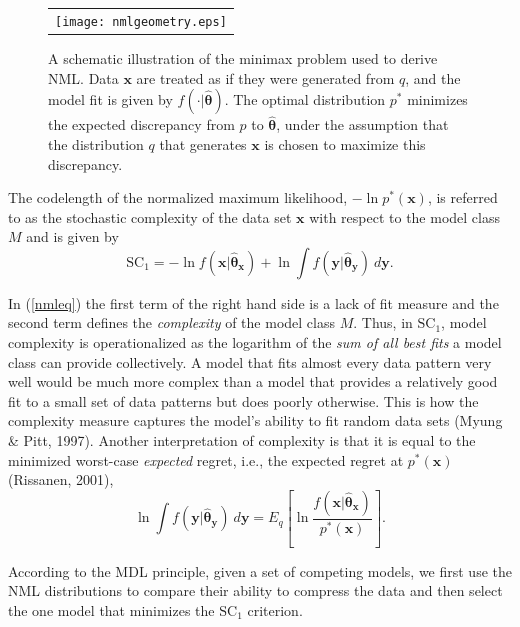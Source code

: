 \documentclass{elsart}
\newcommand{\efc}{\vspace*{15pt}}
\begin{document}
\begin{figure}[t]
   \begin{center}
   \begin{tabular}{c}
  \texttt{[image: nmlgeometry.eps]}
   \end{tabular}
   \end{center}
   \caption{A schematic illustration of the minimax problem used to derive NML. Data $\bm x$
are treated as if they were generated from $q$, and the model fit is given by
$f(\cdot|\hat{\bm\theta})$. The optimal distribution $p^*$ minimizes the expected discrepancy from
$p$ to $\hat{\bm\theta}$, under the assumption that the distribution $q$ that generates $\bm x$ is
chosen to maximize this discrepancy.}
 \label{nmlgeometry}
\efc
\end{figure}

The codelength of the normalized maximum likelihood, $-\ln p^*(\bm x)$, is referred to as the
stochastic complexity of the data set $\bm x$ with respect to the model class $M$ and is given by
\begin{equation} \label{nmleq}
\mbox{SC}_1  =  -\ln f(\bm{x}|\hat{\bm{\theta}}_{\bm{x}}) + \ln \int
f(\bm{y}|\hat{\bm{\theta}}_{\bm{y}}) \ d\bm{y} \nonumber.
\end{equation}

In (\ref{nmleq}) the first term of the right hand side is a lack of fit measure and the second
term defines the {\it complexity} of the model class $M$. Thus, in $\mbox{SC}_1$, model complexity
is operationalized as the logarithm of the {\it sum of all best fits} a model class can provide
collectively. A model that fits almost every data pattern very well would be much more complex
than a model that provides a relatively good fit to a small set of data patterns but does poorly
otherwise. This is how the complexity measure captures the model's ability to fit random data sets
(Myung \& Pitt, 1997). Another interpretation of complexity is that it is equal to the minimized
worst-case {\it expected} regret, i.e., the expected regret at $p^*(\bm x)$ (Rissanen, 2001),
\begin{equation} \label{mc}
\ln \int f(\bm{y}|\hat{\bm{\theta}}_{\bm{y}}) \ d\bm{y} = E_{q}\left[\ln\frac{\displaystyle f(\bm
x |\hat{\bm\theta}_{\bm x})}{\displaystyle p^*(\bm x)}\right].
\end{equation}

According to the MDL principle, given a set of competing models, we first use the NML
distributions to compare their ability to compress the data and then select the one model that
minimizes the $\mbox{SC}_1$ criterion.
\end{document}
